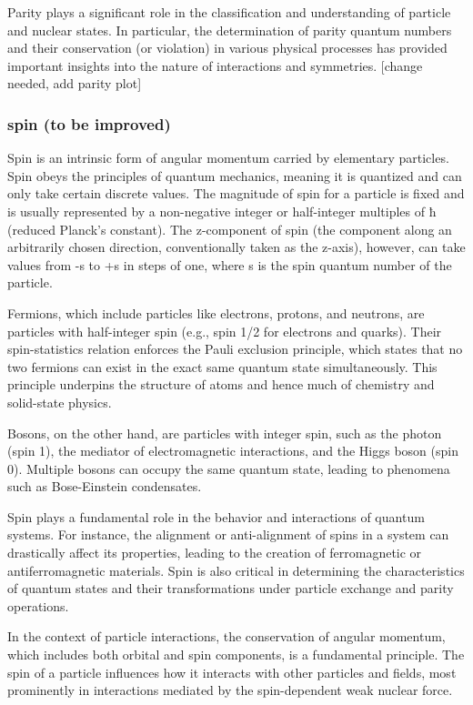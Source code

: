 Parity plays a significant role in the classification and understanding of particle and nuclear states. In particular, the determination of parity quantum numbers and their conservation (or violation) in various physical processes has provided important insights into the nature of interactions and symmetries.
[change needed, add parity plot]

\subsubsection{spin (to be improved)}

Spin is an intrinsic form of angular momentum carried by elementary particles. Spin obeys the principles of quantum mechanics, meaning it is quantized and can only take certain discrete values. The magnitude of spin for a particle is fixed and is usually represented by a non-negative integer or half-integer multiples of ħ (reduced Planck's constant). The z-component of spin (the component along an arbitrarily chosen direction, conventionally taken as the z-axis), however, can take values from -s to +s in steps of one, where s is the spin quantum number of the particle.

Fermions, which include particles like electrons, protons, and neutrons, are particles with half-integer spin (e.g., spin 1/2 for electrons and quarks). Their spin-statistics relation enforces the Pauli exclusion principle, which states that no two fermions can exist in the exact same quantum state simultaneously. This principle underpins the structure of atoms and hence much of chemistry and solid-state physics.

Bosons, on the other hand, are particles with integer spin, such as the photon (spin 1), the mediator of electromagnetic interactions, and the Higgs boson (spin 0). Multiple bosons can occupy the same quantum state, leading to phenomena such as Bose-Einstein condensates.

Spin plays a fundamental role in the behavior and interactions of quantum systems. For instance, the alignment or anti-alignment of spins in a system can drastically affect its properties, leading to the creation of ferromagnetic or antiferromagnetic materials. Spin is also critical in determining the characteristics of quantum states and their transformations under particle exchange and parity operations.

In the context of particle interactions, the conservation of angular momentum, which includes both orbital and spin components, is a fundamental principle. The spin of a particle influences how it interacts with other particles and fields, most prominently in interactions mediated by the spin-dependent weak nuclear force.


